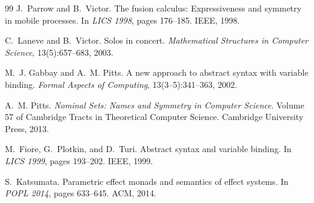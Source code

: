 \documentclass[11pt]{article}
\theoremstyle{plain}
\theoremstyle{definition}
\theoremstyle{remark}
\begin{document}
\begin{thebibliography}{99}
J.~Parrow and B.~Victor.
\newblock The fusion calculus: Expressiveness and symmetry in mobile processes.
\newblock In \emph{LICS 1998}, pages 176--185. IEEE, 1998.

C.~Laneve and B.~Victor.
\newblock Solos in concert.
\newblock \emph{Mathematical Structures in Computer Science}, 13(5):657--683, 2003.

M.~J. Gabbay and A.~M. Pitts.
\newblock A new approach to abstract syntax with variable binding.
\newblock \emph{Formal Aspects of Computing}, 13(3--5):341--363, 2002.

A.~M. Pitts.
\newblock \emph{Nominal Sets: Names and Symmetry in Computer Science}.
\newblock Volume 57 of Cambridge Tracts in Theoretical Computer Science. Cambridge University Press, 2013.

M.~Fiore, G.~Plotkin, and D.~Turi.
\newblock Abstract syntax and variable binding.
\newblock In \emph{LICS 1999}, pages 193--202. IEEE, 1999.

S.~Katsumata.
\newblock Parametric effect monads and semantics of effect systems.
\newblock In \emph{POPL 2014}, pages 633--645. ACM, 2014.

\end{thebibliography}
\end{document}
